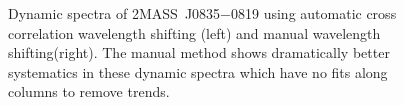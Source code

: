 \documentclass[manuscript]{aastex6}
\newcommand{\sha}{2MASS~J0835$-$0819}
\begin{document}
\begin{figure}[!t]
\centering
{}
	\caption{Dynamic spectra of {\sha} using automatic cross correlation wavelength shifting (left) and manual wavelength shifting(right).
	The manual method shows dramatically better systematics in these dynamic spectra which have no fits along columns to remove trends.}
	\label{fig:manualVsAutoShift0835}
	\vspace{0.1in}
\end{figure} 
\end{document}
